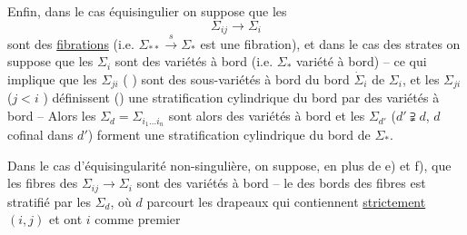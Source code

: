 Enfin, dans le cas équisingulier on suppose que les
\[
\Sigma_{ij}\longrightarrow\Sigma_i
\]
sont des \uline{fibrations} (i.e. $\Sigma_{**}\xrightarrow{s}\Sigma_*$ est une fibration), et dans le cas des strates  on suppose que les $\Sigma_i$ sont des variétés à bord (i.e. $\Sigma_*$ variété à bord) -- ce qui implique que les $\Sigma_{ji}$ ( ) sont des sous-variétés à bord du  bord $\dot\Sigma_i$ de $\Sigma_i$, et les $\Sigma_{ji}$ ($j<i$ ) définissent () une stratification cylindrique du \deleted{$\unsure{\Sigma_*}$} bord par des variétés à bord -- Alors les $\Sigma_d=\Sigma_{i_1\ldots i_n}$ sont alors des variétés à bord  et les $\Sigma_{d'}$ ($d'\supsetneqq d$, $d$ cofinal dans $d'$)  forment une stratification cylindrique du bord  de $\Sigma_*$.

Dans le cas d'équisingularité non-singulière, on suppose, en plus de e) et f), que les fibres des  $\Sigma_{ij}\longrightarrow\Sigma_i$ sont des variétés à bord -- le   des bords des fibres est  stratifié par les $\Sigma_d$, où $d$  parcourt les drapeaux qui contiennent \uline{strictement} \deleted{$\unsure{\Sigma}$} $(i,j)$ et ont $i$ comme premier

